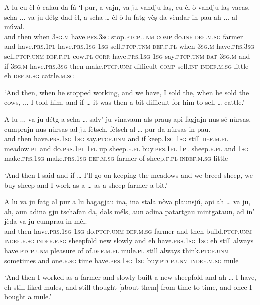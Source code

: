 \begin{linenumbers}
\gll  A lu cu èl ò calau da fá `l pur, a vajn, va ju vandju laṣ, cu èl ò vandju laṣ vacas, scha ... va ju détg dad èl, a scha … èl ò lu fatg vèṣ da vèndar in pau ah ... al múval.\\
and then when \textsc{3sg.m} have.\textsc{prs.3sg} stop.\textsc{ptcp.unm} \textsc{comp} do.\textsc{inf} \textsc{def.m.sg} farmer and have.\textsc{prs.1pl} have.\textsc{prs.1sg} \textsc{1sg} sell.\textsc{ptcp.unm}  \textsc{def.f.pl} when \textsc{3sg.m} have.\textsc{prs.3sg} sell.\textsc{ptcp.unm} \textsc{def.f.pl} cow.\textsc{pl} \textsc{corr} {} have.\textsc{prs.1sg} \textsc{1sg} say.\textsc{ptcp.unm} \textsc{dat} \textsc{3sg.m} and if {} \textsc{3sg.m} have.\textsc{prs.3sg} then make.\textsc{ptcp.unm} difficult \textsc{comp} sell.\textsc{inf} \textsc{indef.m.sg} little eh {} \textsc{def.m.sg} cattle.\textsc{m.sg} \\
\end{linenumbers} 
\medskip
\glt `And then, when he stopped working, and we have, I sold the, when he sold the cows, ... I told him, and if … it was then a bit difficult for him to sell … cattle.'
\medskip

\begin{linenumbers}
\gll  A lu ... va ju détg a scha … salv’ ju vinavaun als prauṣ api fagjajn nus sé nùrsas, cumprajn nus nùrsas ad ju fètsch, fètsch al … pur da nùrsas in pau.\\
and then {} have.\textsc{prs.1sg} \textsc{1sg} say.\textsc{ptcp.unm} and if {} keep.\textsc{1sg} \textsc{1sg} still \textsc{def.m.pl} meadow.\textsc{pl} and do.\textsc{prs.1pl} \textsc{1pl} up sheep.\textsc{f.pl} buy.\textsc{prs.1pl} \textsc{1pl} sheep.\textsc{f.pl} and \textsc{1sg} make.\textsc{prs.1sg} make.\textsc{prs.1sg} \textsc{def.m.sg} {} farmer of sheep.\textsc{f.pl} \textsc{indef.m.sg} little\\
\end{linenumbers}
\medskip
\glt `And then I said and if …  I'll go on keeping the meadows and we breed sheep, we buy sheep and I work as a … as a sheep farmer a bit.'
\medskip

\begin{linenumbers}
\gll A lu va ju fatg al pur a lu bagagjau ina, ina stala nòva plaunsjú, api ah … va ju, ah, aun adina gju tschafan da, dals méls, aun adina patartgau mintgataun, ad in’ jèda va ju cumprau in mél. \\
and then have.\textsc{prs.1sg} \textsc{1sg} do.\textsc{ptcp.unm} \textsc{def.m.sg} farmer and then build.\textsc{ptcp.unm} \textsc{indef.f.sg} \textsc{indef.f.sg} sheepfold new slowly and eh {} have.\textsc{prs.1sg} \textsc{1sg} eh still always have.\textsc{ptcp.unm} pleasure of  of.\textsc{def.m.pl} mule.\textsc{pl} still always think.\textsc{ptcp.unm} sometimes and one.\textsc{f.sg} time have.\textsc{prs.1sg} \textsc{1sg}  buy.\textsc{ptcp.unm} \textsc{indef.m.sg} mule \\
\end{linenumbers}
\medskip
\glt `And then I worked as a farmer and slowly built a new sheepfold and ah … I have, eh still liked mules, and still thought [about them] from time to time, and once I bought a mule.'
\medskip

